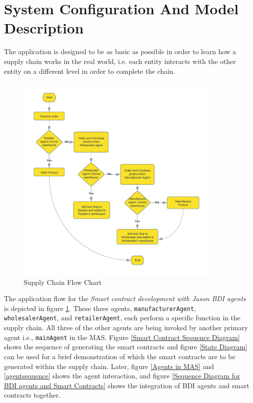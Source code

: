 \section{System Configuration And Model Description}

The application is designed to be as basic as possible in order to learn how a supply chain works in the real world, i.e. each entity interacts with the other entity on a different level in order to complete the chain.

    \begin{figure}[h]
    \centering
      \includegraphics[width=10cm]{includes/figures/Flow Chart.png}
      \caption{Supply Chain Flow Chart}
      \label{Flow chart}
    \end{figure}

\vspace{.5cm}

The application flow for the \textit{Smart contract development with Jason \ac{BDI} agents} is depicted in figure \ref{Flow chart}. These three agents, \texttt{manufacturerAgent}, \texttt{wholesalerAgent}, and \texttt{retailerAgent}, each perform a specific function in the supply chain. All three of the other agents are being invoked by another primary agent i.e., \texttt{mainAgent} in the \ac{MAS}. Figure 
 \ref{Smart Contract Sequence Diagram}  shows the sequence of generating the smart contracts and figure \ref{State Diagram} can be used for a brief demonstration of which the smart contracts are to be generated within the supply chain.
Later, figure \ref{Agents in MAS} and \ref{agentsequence} shows the agent interaction, and figure \ref{Sequence Diagram for BDI agents and Smart Contracts} shows the integration of \ac{BDI} agents and smart contracts together.

